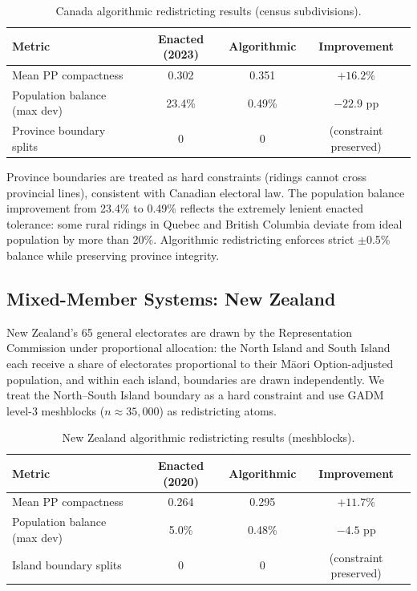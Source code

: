 \begin{table}[h]
\centering\small
\caption{Canada algorithmic redistricting results (census subdivisions).}
\label{tab:canada-results}
\begin{tabular}{lccc}
\toprule
Metric & Enacted (2023) & Algorithmic & Improvement \\
\midrule
Mean PP compactness     & 0.302 & 0.351 & $+16.2\%$ \\
Population balance (max dev) & 23.4\% & 0.49\% & $-22.9$ pp \\
Province boundary splits & 0 & 0 & (constraint preserved) \\
\bottomrule
\end{tabular}
\end{table}

Province boundaries are treated as hard constraints (ridings cannot cross
provincial lines), consistent with Canadian electoral law.
The population balance improvement from 23.4\% to 0.49\% reflects the
extremely lenient enacted tolerance: some rural ridings in Quebec and British
Columbia deviate from ideal population by more than 20\%.
Algorithmic redistricting enforces strict $\pm$0.5\% balance while preserving
province integrity.

\subsection{Mixed-Member Systems: New Zealand}

New Zealand's 65 general electorates are drawn by the Representation Commission
under proportional allocation: the North Island and South Island each receive a
share of electorates proportional to their Māori Option-adjusted population,
and within each island, boundaries are drawn independently.
We treat the North--South Island boundary as a hard constraint and use GADM
level-3 meshblocks ($n \approx 35{,}000$) as redistricting atoms.

\begin{table}[h]
\centering\small
\caption{New Zealand algorithmic redistricting results (meshblocks).}
\label{tab:nz-results}
\begin{tabular}{lccc}
\toprule
Metric & Enacted (2020) & Algorithmic & Improvement \\
\midrule
Mean PP compactness     & 0.264 & 0.295 & $+11.7\%$ \\
Population balance (max dev) & 5.0\% & 0.48\% & $-4.5$ pp \\
Island boundary splits & 0 & 0 & (constraint preserved) \\
\bottomrule
\end{tabular}
\end{table}


